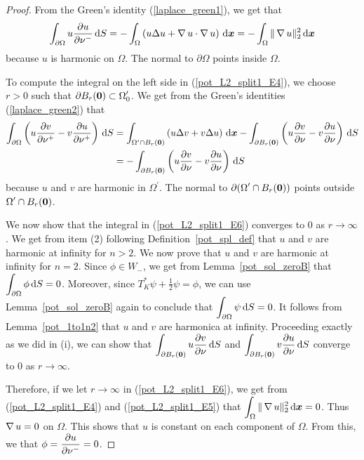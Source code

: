 \begin{proof}
From the Green's identity (\ref{laplace_green1}), we get that
\begin{equation} \label{pot_L2_split1_E5}
\int_{\partial \Omega} u \frac{\partial{u}}{\partial \nu^-} \,\mathrm{d}{S} 
= -\int_{\Omega} \left( u \Delta u + \operatorname{\nabla} u \cdot \operatorname{\nabla} u \right)
\,\mathrm{d}{{\bm{x}}}
= -\int_{\Omega} \|\operatorname{\nabla} u\|_2^2 \,\mathrm{d}{{\bm{x}}}
\end{equation}
because $u$ is harmonic on $\Omega$.  The normal to $\partial \Omega$
points inside $\Omega$.

To compute the integral on the left side in (\ref{pot_L2_split1_E4}),
we choose $r>0$ such that
$\displaystyle \partial B_r({\bm{0}}) \subset \Omega_0^{\prime}$.
We get from the Green's identities (\ref{laplace_green2}) that
\begin{align}
\int_{\partial \Omega} \left( u \frac{\partial{v}}{\partial \nu^+}
- v \frac{\partial{u}}{\partial \nu^+} \right) \,\mathrm{d}{S}
&= \int_{\Omega^{\prime} \cap B_r({\bm{0}})}
\left( u \Delta v + v \Delta u \right) \,\mathrm{d}{{\bm{x}}}
- \int_{\partial B_r({\bm{0}})} \left( u \frac{\partial{v}}{\partial \nu}
- v \frac{\partial{u}}{\partial \nu} \right) \,\mathrm{d}{S}
\nonumber \\
&= - \int_{\partial B_r({\bm{0}})} \left( u \frac{\partial{v}}{\partial \nu}
- v \frac{\partial{u}}{\partial \nu} \right) \,\mathrm{d}{S}
\label{pot_L2_split1_E6}
\end{align}
because $u$ and $v$ are harmonic in $\displaystyle \Omega^{\prime}$.
The normal to $\displaystyle \partial (\Omega^{\prime} \cap B_r({\bm{0}}))$
points outside $\displaystyle \Omega^{\prime} \cap B_r({\bm{0}})$.

We now show that the integral in (\ref{pot_L2_split1_E6}) converges
to $0$ as $r \to \infty$.  We get from item (2) following
Definition~\ref{pot_spl_def} that $u$ and $v$ are harmonic at infinity for
$n>2$.  We now prove that $u$ and $v$ are harmonic at infinity for $n=2$.
Since $\phi \in W_-$, we get from Lemma~\ref{pot_sol_zeroB} that
$\displaystyle \int_{\partial \Omega} \phi \,\mathrm{d}{S} = 0$.
Moreover, since $\displaystyle T^\ast_K \psi + \frac{1}{2} \psi = \phi$,
we can use Lemma~\ref{pot_sol_zeroB} again to conclude that
$\displaystyle \int_{\partial \Omega} \psi \,\mathrm{d}{S} = 0$.
It follows from Lemma~\ref{pot_1to1n2} that $u$ and $v$ are harmonica
at infinity.  Proceeding exactly as we did in (i), we can show that
$\displaystyle \int_{\partial B_r({\bm{0}})} u \frac{\partial{v}}{\partial \nu} \,\mathrm{d}{S}$
and
$\displaystyle \int_{\partial B_r({\bm{0}})} v \frac{\partial{u}}{\partial \nu}  \,\mathrm{d}{S}$
converge to $0$ as $r \to \infty$.

Therefore, if we let $r \to \infty$ in (\ref{pot_L2_split1_E6}), we
get from (\ref{pot_L2_split1_E4}) and (\ref{pot_L2_split1_E5}) that
$\displaystyle \int_{\Omega} \|\operatorname{\nabla} u\|_2^2 \,\mathrm{d}{{\bm{x}}} = 0$.
Thus $\operatorname{\nabla} u = 0$ on $\Omega$.  This shows that $u$ is
constant on each component of $\Omega$.  From this, we
that $\displaystyle \phi = \frac{\partial{u}}{\partial \nu^-} = 0$.
\end{proof}

